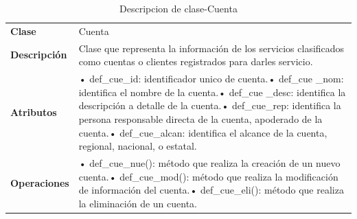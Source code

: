 \begin{table}[H]
	\centering
	\caption{Descripcion de clase-Cuenta}
	\begin{tabular}{|p{6.145em}|p{28.07em}|}
		\toprule
		\rowcolor[rgb]{ .125,  .216,  .392} \multicolumn{2}{|p{34.215em}|}{\textcolor[rgb]{ 1,  1,  1}{\textbf{Clase Cuenta}}} \\
		\midrule
		\textbf{Clase} & \multicolumn{1}{l|}{Cuenta} \\
		\midrule
		\textbf{Descripción} & Clase que representa la información de los servicios clasificados como cuentas o clientes registrados para darles servicio. \\
		\midrule
		\textbf{Atributos } & •	def\_cue\_id: identificador unico de cuenta.\newline{}•	def\_cue \_nom: identifica el nombre de la cuenta.\newline{}•	def\_cue \_desc: identifica la descripción a detalle de la cuenta.\newline{}•	def\_cue\_rep: identifica la persona responsable directa de la cuenta, apoderado de la cuenta.\newline{}•	def\_cue\_alcan: identifica el alcance de la cuenta, regional, nacional, o estatal. \\
		\midrule
		\textbf{Operaciones} & •	def\_cue\_nue():  método que realiza la creación de un nuevo cuenta.\newline{}•	def\_cue\_mod(): método que  realiza la modificación de información del cuenta.\newline{}•	def\_cue\_eli(): método que realiza la eliminación de un cuenta. \\
		\bottomrule
	\end{tabular}%
	\label{tab:CLass12}%
\end{table}%


